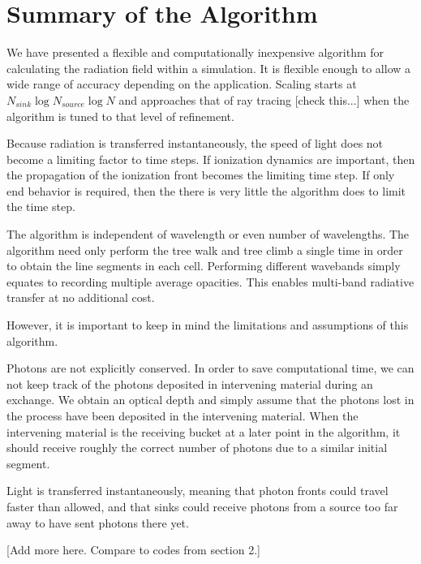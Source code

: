 \section{Summary of the Algorithm}
\label{sec:algorithmsummary}

We have presented a flexible and computationally inexpensive algorithm for calculating the radiation field within a simulation. It is flexible enough to allow a wide range of accuracy depending on the application. Scaling starts at  $N_{sink}\log{N_{source}}\log{N}$ and approaches that of ray tracing [check this...] when the algorithm is tuned to that level of refinement.

Because radiation is transferred instantaneously, the speed of light does not become a limiting factor to time steps. If ionization dynamics are important, then the propagation of the ionization front becomes the limiting time step. If only end behavior is required, then the there is very little the algorithm does to limit the time step.

The algorithm is independent of wavelength or even number of wavelengths. The algorithm need only perform the tree walk and tree climb a single time in order to obtain the line segments in each cell. Performing different wavebands simply equates to recording multiple average opacities. This enables multi-band radiative transfer at no additional cost.

However, it is important to keep in mind the limitations and assumptions of this algorithm.

Photons are not explicitly conserved. In order to save computational time, we can not keep track of the photons deposited in intervening material during an exchange. We obtain an optical depth and simply assume that the photons lost in the process have been deposited in the intervening material. When the intervening material is the receiving bucket at a later point in the algorithm, it should receive roughly the correct number of photons due to a similar initial segment.

Light is transferred instantaneously, meaning that photon fronts could travel faster than allowed, and that sinks could receive photons from a source too far away to have sent photons there yet.

[Add more here. Compare to codes from section 2.]